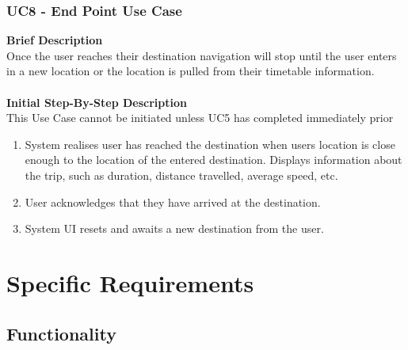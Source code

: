 \documentclass[a4paper, 12pt, one column, aas_macros]{article}
\begin{document}
\subsubsection{UC8 - End Point Use Case}
\textbf{Brief Description}\\
Once the user reaches their destination navigation will stop until the user enters in a new location or the location is pulled from their timetable information.\\
\\\textbf{Initial Step-By-Step Description}\\
This Use Case cannot be initiated unless UC5 has completed immediately prior
\begin{enumerate}
\item System realises user has reached the destination when users location is close enough to the location of the entered destination. Displays information about the trip, such as duration, distance travelled, average speed, etc.
\item User acknowledges that they have arrived at the destination.
\item System UI resets and awaits a new destination from the user.
\end{enumerate}


\section{Specific Requirements}


\subsection{Functionality}
\end{document}
